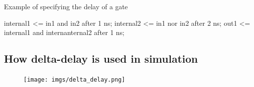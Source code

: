 \documentclass[a4paper,11pt,norsk]{article}
\begin{document}
Example of specifying the delay of a gate
\begin{vhdlcode}
internal1 <= in1 and in2 after 1 ns; 
internal2 <= in1 nor in2 after 2 ns; 
out1 <= internal1 and internanternal2 after 1 ns; 
\end{vhdlcode}

\subsection{How delta-delay is used in simulation}
\begin{figure}[H]
    \centering
    \texttt{[image: imgs/delta\_delay.png]} 
\end{figure}
\end{document}
